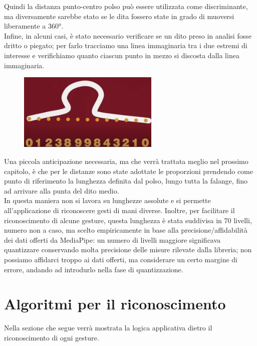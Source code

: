 \begin{multicols}{2}
\begin{multicolfigure}
    \end{multicolfigure} 
\end{multicols}
\vspace{+ 15 px}

\noindent Quindi la distanza punto-centro polso può essere utilizzata come discriminante, ma diversamente sarebbe stato se le dita fossero state in grado di muoversi liberamente a 360°.\\
\newpage
\noindent Infine, in alcuni casi, è stato necessario verificare se un dito preso in analisi fosse dritto o piegato; per farlo tracciamo una linea immaginaria tra i due estremi di interesse e verifichiamo quanto ciascun punto in mezzo si discosta dalla linea immaginaria.
\begin{figure}[H]
    \centering
    \includegraphics[width=0.6\textwidth]{images/disegno_linea.png}
\end{figure}

\noindent Una piccola anticipazione necessaria, ma che verrà trattata meglio nel prossimo capitolo, è che per le distanze sono state adottate le proporzioni 
prendendo come punto di riferimento la lunghezza definita dal polso, lungo tutta la falange, fino ad arrivare alla punta del dito medio.\\
In questa maniera non si lavora su lunghezze assolute e si permette all'applicazione di riconoscere gesti di mani diverse. 
Inoltre, per facilitare il riconoscimento di alcune gesture, questa lunghezza è stata suddivisa in 70 livelli, numero non a caso, 
ma scelto empiricamente in base alla precisione/affidabilità dei dati offerti da MediaPipe: un numero di livelli 
maggiore significava quantizzare conservando molta precisione delle misure rilevate dalla libreria; 
non possiamo affidarci troppo ai dati offerti, ma considerare un certo margine di errore, andando ad introdurlo nella fase di quantizzazione. 

\newpage
\section{Algoritmi per il riconoscimento}
Nella sezione che segue verrà mostrata la logica applicativa dietro il riconoscimento di ogni gesture.

